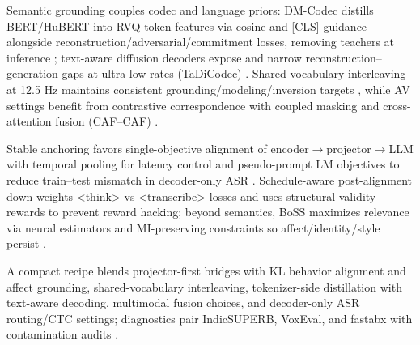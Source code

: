 \documentclass{article}
\begin{document}
Semantic grounding couples codec and language priors: DM-Codec distills BERT/HuBERT into RVQ token features via cosine and [CLS] guidance alongside reconstruction/adversarial/commitment losses, removing teachers at inference \cite{ahasan2025dmcodecdistillingmultimodalrepresentatio}; text-aware diffusion decoders expose and narrow reconstruction--generation gaps at ultra-low rates (TaDiCodec) \cite{wang2025tadicodectextawarediffusionspeechtokeniz}. Shared-vocabulary interleaving at 12.5 Hz maintains consistent grounding/modeling/inversion targets \cite{zeng2024scalingspeechtextpretrainingsyntheticint}, while AV settings benefit from contrastive correspondence with coupled masking and cross-attention fusion (CAF--CAF) \cite{sadok2025vectorquantizedmaskedautoencoderaudiovis}.

Stable anchoring favors single-objective alignment of encoder$\rightarrow$projector$\rightarrow$LLM with temporal pooling for latency control and pseudo-prompt LM objectives to reduce train--test mismatch in decoder-only ASR \cite{nguyen2025qwenvsgemmaintegrationwhispercomparative,tsunoo2024decoderonlyarchitecturespeechrecognition}. Schedule-aware post-alignment down-weights <think> vs <transcribe> losses and uses structural-validity rewards to prevent reward hacking; beyond semantics, BoSS maximizes relevance via neural estimators and MI-preserving constraints so affect/identity/style persist \cite{li2025seewossubmissionmlcslmlessonslearnedspee,wang2025bossbeyondsemanticspeech}.

A compact recipe blends projector-first bridges with KL behavior alignment and affect grounding, shared-vocabulary interleaving, tokenizer-side distillation with text-aware decoding, multimodal fusion choices, and decoder-only ASR routing/CTC settings; diagnostics pair IndicSUPERB, VoxEval, and fastabx with contamination audits \cite{nguyen2025qwenvsgemmaintegrationwhispercomparative,wang2024blspemotowardsempatheticlargespeechlangu,zeng2024scalingspeechtextpretrainingsyntheticint,ahasan2025dmcodecdistillingmultimodalrepresentatio,wang2025tadicodectextawarediffusionspeechtokeniz,sadok2025vectorquantizedmaskedautoencoderaudiovis,tsunoo2024decoderonlyarchitecturespeechrecognition,li2025seewossubmissionmlcslmlessonslearnedspee,wang2025bossbeyondsemanticspeech,entry2025indicsuperbspeechprocessinguniversalperf,turetzky2024lastlanguagemodelawarespeechtokenization,cui2025voxevalbenchmarkingknowledgeunderstandin,tseng2025evaluationllmsspeechisoftenflawedtestset}.
\end{document}
